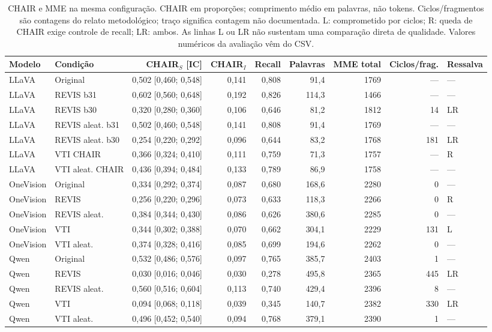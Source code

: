 \begin{table}[t]\centering\small
\caption{CHAIR e MME na mesma configuração. CHAIR em proporções; comprimento médio em palavras, não tokens. Ciclos/fragmentos são contagens do relato metodológico; traço significa contagem não documentada. L: comprometido por ciclos; R: queda de CHAIR exige controle de recall; LR: ambos. As linhas L ou LR não sustentam uma comparação direta de qualidade. Valores numéricos da avaliação vêm do CSV.}
\label{tab:chair}\begin{tabular}{llrrrrrrl}\toprule
Modelo & Condição & CHAIR$_S$ [IC] & CHAIR$_I$ & Recall & Palavras & MME total & Ciclos/frag. & Ressalva \\ \midrule
LLaVA & Original & 0,502 [0,460; 0,548] & 0,141 & 0,808 & 91,4 & 1769 & --- & --- \\
LLaVA & REVIS b31 & 0,602 [0,560; 0,648] & 0,192 & 0,826 & 114,3 & 1466 & --- & --- \\
LLaVA & REVIS b30 & 0,320 [0,280; 0,360] & 0,106 & 0,646 & 81,2 & 1812 & 14 & LR \\
LLaVA & REVIS aleat. b31 & 0,502 [0,460; 0,548] & 0,141 & 0,808 & 91,4 & 1769 & --- & --- \\
LLaVA & REVIS aleat. b30 & 0,254 [0,220; 0,292] & 0,096 & 0,644 & 83,2 & 1768 & 181 & LR \\
LLaVA & VTI CHAIR & 0,366 [0,324; 0,410] & 0,111 & 0,759 & 71,3 & 1757 & --- & R \\
LLaVA & VTI aleat. CHAIR & 0,436 [0,394; 0,484] & 0,133 & 0,789 & 86,9 & 1758 & --- & --- \\
\midrule
OneVision & Original & 0,334 [0,292; 0,374] & 0,087 & 0,680 & 168,6 & 2280 & 0 & --- \\
OneVision & REVIS & 0,256 [0,220; 0,296] & 0,073 & 0,633 & 118,3 & 2266 & 0 & R \\
OneVision & REVIS aleat. & 0,384 [0,344; 0,430] & 0,086 & 0,626 & 380,6 & 2285 & 0 & --- \\
OneVision & VTI & 0,344 [0,302; 0,388] & 0,070 & 0,662 & 304,1 & 2229 & 131 & L \\
OneVision & VTI aleat. & 0,374 [0,328; 0,416] & 0,085 & 0,699 & 194,6 & 2262 & 0 & --- \\
\midrule
Qwen & Original & 0,532 [0,486; 0,576] & 0,097 & 0,765 & 385,7 & 2403 & 1 & --- \\
Qwen & REVIS & 0,030 [0,016; 0,046] & 0,030 & 0,278 & 495,8 & 2365 & 445 & LR \\
Qwen & REVIS aleat. & 0,560 [0,516; 0,604] & 0,113 & 0,740 & 429,4 & 2396 & 8 & --- \\
Qwen & VTI & 0,094 [0,068; 0,118] & 0,039 & 0,345 & 140,7 & 2382 & 330 & LR \\
Qwen & VTI aleat. & 0,496 [0,452; 0,540] & 0,094 & 0,768 & 379,1 & 2390 & 1 & --- \\
\bottomrule\end{tabular}\end{table}
